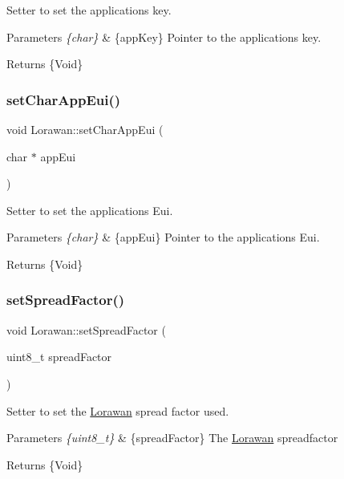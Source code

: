 Setter to set the applications key. 
\begin{DoxyParams}{Parameters}
{\em \{char\}} & \{app\+Key\} Pointer to the application\textquotesingle{}s key. \\
\hline
\end{DoxyParams}
\begin{DoxyReturn}{Returns}
\{Void\} 
\end{DoxyReturn}
\mbox{\label{class_lorawan_a0b79ba499200cd96859d518a47306fa9}} 
\subsubsection{\texorpdfstring{set\+Char\+App\+Eui()}{setCharAppEui()}}
{\footnotesize\ttfamily void Lorawan\+::set\+Char\+App\+Eui (\begin{DoxyParamCaption}\item[{char $\ast$}]{app\+Eui }\end{DoxyParamCaption})}

Setter to set the applications Eui. 
\begin{DoxyParams}{Parameters}
{\em \{char\}} & \{app\+Eui\} Pointer to the application\textquotesingle{}s Eui. \\
\hline
\end{DoxyParams}
\begin{DoxyReturn}{Returns}
\{Void\} 
\end{DoxyReturn}
\mbox{\label{class_lorawan_a58ab6ca02b1c7e1f57618818ece5e86b}} 
\subsubsection{\texorpdfstring{set\+Spread\+Factor()}{setSpreadFactor()}}
{\footnotesize\ttfamily void Lorawan\+::set\+Spread\+Factor (\begin{DoxyParamCaption}\item[{uint8\+\_\+t}]{spread\+Factor }\end{DoxyParamCaption})}

Setter to set the \mbox{\hyperlink{class_lorawan}{Lorawan}} spread factor used. 
\begin{DoxyParams}{Parameters}
{\em \{uint8\+\_\+t\}} & \{spread\+Factor\} The \mbox{\hyperlink{class_lorawan}{Lorawan}} spreadfactor \\
\hline
\end{DoxyParams}
\begin{DoxyReturn}{Returns}
\{Void\} 
\end{DoxyReturn}


